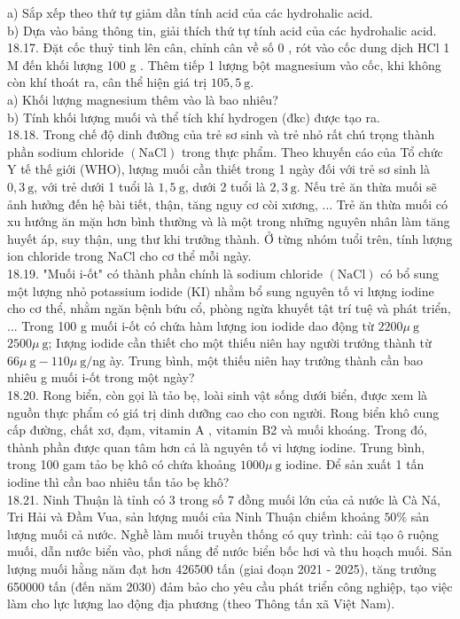 \documentclass[10pt]{article}
\begin{document}
a) Sắp xếp theo thứ tự giảm dần tính acid của các hydrohalic acid.\\
b) Dựa vào bảng thông tin, giải thích thứ tự tính acid của các hydrohalic acid.\\
18.17. Đặt cốc thuỷ tinh lên cân, chỉnh cân về số 0 , rót vào cốc dung dịch HCl 1 M đến khối lượng 100 g . Thêm tiếp 1 lượng bột magnesium vào cốc, khi không còn khí thoát ra, cân thể hiện giá trị $105,5 \mathrm{~g}$.\\
a) Khối lượng magnesium thêm vào là bao nhiêu?\\
b) Tính khối lượng muối và thể tích khí hydrogen (đkc) được tạo ra.\\
18.18. Trong chế độ dinh đưỡng của trẻ sơ sinh và trẻ nhỏ rất chú trọng thành phần sodium chloride $(\mathrm{NaCl})$ trong thực phẩm. Theo khuyến cáo của Tổ chức Y tế thế giới (WHO), lượng muối cần thiết trong 1 ngày đối với trẻ sơ sinh là $0,3 \mathrm{~g}$, với trẻ dưới 1 tuổi là $1,5 \mathrm{~g}$, dưới 2 tuổi là $2,3 \mathrm{~g}$. Nếu trẻ ăn thừa muối sẽ ảnh hưởng đến hệ bài tiết, thận, tăng nguy cơ còi xương, ... Trẻ ăn thừa muối có xu hướng ăn mặn hơn bình thường và là một trong những nguyên nhân làm tăng huyết áp, suy thận, ung thư khi trưởng thành. Ở từng nhóm tuổi trên, tính lượng ion chloride trong NaCl cho cơ thể mỗi ngày.\\
18.19. "Muối i-ốt" có thành phần chính là sodium chloride $(\mathrm{NaCl})$ có bổ sung một lượng nhỏ potassium iodide (KI) nhằm bổ sung nguyên tố vi lượng iodine cho cơ thể, nhằm ngăn bệnh bứu cổ, phòng ngừa khuyết tật trí tuệ và phát triển, ... Trong 100 g muối i-ốt có chứa hàm lượng ion iodide dao động từ $2200 \mu \mathrm{~g}$ $2500 \mu \mathrm{~g}$; Iượng iodide cần thiết cho một thiếu niên hay người trưởng thành từ $66 \mu \mathrm{~g}-110 \mu \mathrm{~g} / \mathrm{ng}$ ày. Trung bình, một thiếu niên hay trưởng thành cần bao nhiêu g muối i-ốt trong một ngày?\\
18.20. Rong biển, còn gọi là tảo bẹ, loài sinh vật sống dưới biển, được xem là nguồn thực phẩm có giá trị dinh dưỡng cao cho con người. Rong biển khô cung cấp đường, chất xơ, đạm, vitamin A , vitamin B2 và muối khoáng. Trong đó, thành phần được quan tâm hơn cả là nguyên tố vi lượng iodine. Trung bình, trong 100 gam tảo bẹ khô có chứa khoảng $1000 \mu \mathrm{~g}$ iodine. Để sản xuất 1 tấn iodine thì cần bao nhiêu tấn tảo bẹ khô?\\
18.21. Ninh Thuận là tỉnh có 3 trong số 7 đồng muối lớn của cả nước là Cà Ná, Tri Hải và Đầm Vua, sản lượng muối của Ninh Thuận chiếm khoảng $50 \%$ sản lượng muối cả nước. Nghề làm muối truyền thống có quy trình: cải tạo ô ruộng muối, dẫn nước biển vào, phơi nắng để nước biển bốc hơi và thu hoạch muối. Sản lượng muối hằng năm đạt hơn 426500 tấn (giai đoạn 2021 - 2025), tăng trưởng 650000 tấn (đến năm 2030) đảm bảo cho yêu cầu phát triển công nghiệp, tạo việc làm cho lực lượng lao động địa phương (theo Thông tấn xã Việt Nam).\\
\end{document}
